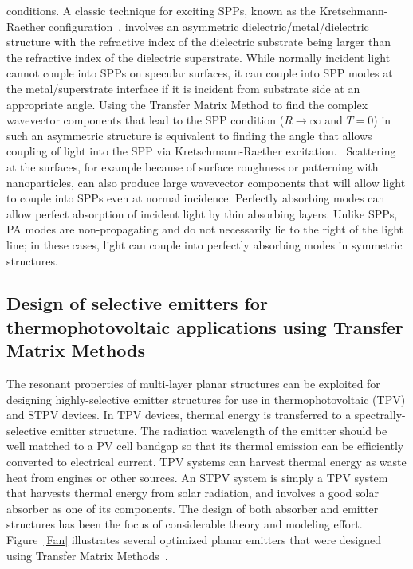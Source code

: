 \documentclass[review]{elsarticle}
\begin{document}
conditions.  A classic technique for exciting SPPs, known as the
Kretschmann-Raether configuration~\cite{Raether},  involves an asymmetric
dielectric/metal/dielectric structure with the refractive index of the
dielectric substrate being larger than the refractive index of the
dielectric superstrate.  While normally incident light cannot couple into
SPPs on specular surfaces, it can couple into SPP modes at the
metal/superstrate interface if it is incident from substrate side at an
appropriate angle.  Using the Transfer Matrix Method to find the complex
wavevector components that lead to the SPP condition ($R \rightarrow
\infty$ and $T=0$) in such an asymmetric structure is equivalent to
finding the angle that allows coupling of light into the SPP via
Kretschmann-Raether excitation.~\cite{Raether, FHR_SciRep_2015}
Scattering at the surfaces, for example because of surface roughness or
patterning with nanoparticles, can also produce large wavevector
components that will allow light to couple into SPPs even at normal
incidence.  Perfectly absorbing modes can allow perfect absorption of
incident light by thin absorbing layers.  Unlike SPPs, PA modes are
non-propagating and do not necessarily lie to the right of the light line;
in these cases, light can couple into perfectly absorbing modes in
symmetric structures.~\cite{FHR_SciRep_2015}

\subsection{Design of selective emitters for thermophotovoltaic applications using Transfer Matrix Methods}
The resonant properties of multi-layer planar structures can be exploited for designing highly-selective emitter structures for use in
thermophotovoltaic (TPV) and STPV devices.  In TPV devices, thermal energy is transferred to a 
spectrally-selective emitter
structure.  The radiation wavelength of the emitter should be well matched to a PV cell bandgap so that its thermal emission can be efficiently converted
to electrical current.  TPV systems can harvest thermal energy as waste heat from engines or other sources.  An STPV system is simply 
a TPV system that harvests thermal energy from solar radiation, and involves a good solar absorber as one of its components.
The design of both absorber and emitter structures has been the focus of considerable theory and modeling effort.
Figure~\ref{Fan} illustrates several optimized planar emitters that were designed using Transfer Matrix Methods~\cite{BN_JApplPhys_2005, LZ_JApplPhys_2006, RF_OptExp_2009}.
\end{document}

